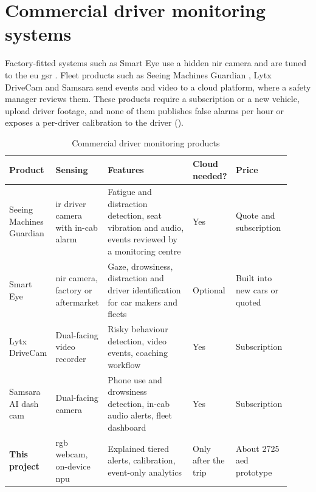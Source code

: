 \section{Commercial driver monitoring systems}
\label{sec:commercial}

Factory-fitted systems such as Smart Eye \cite{r62} use a hidden \gls{nir} camera and are tuned to the \gls{eu} \gls{gsr} \cite{r11}. Fleet products such as Seeing Machines Guardian \cite{r61}, Lytx DriveCam \cite{r63} and Samsara \cite{r64} send events and video to a cloud platform, where a safety manager reviews them. These products require a subscription or a new vehicle, upload driver footage, and none of them publishes false alarms per hour or exposes a per-driver calibration to the driver ().


\begin{table}[htbp]
\centering
\caption{Commercial driver monitoring products}
\label{tab:ch2-02}
\footnotesize
\setlength{\tabcolsep}{3pt}
\renewcommand{\arraystretch}{1.15}
\begin{tabular}{|p{0.165\linewidth}|p{0.175\linewidth}|p{0.300\linewidth}|p{0.130\linewidth}|p{0.150\linewidth}|}
\hline
\textbf{Product} & \textbf{Sensing} & \textbf{Features} & \textbf{Cloud needed?} & \textbf{Price} \\
\hline
Seeing Machines Guardian \cite{r61} & \gls{ir} driver camera with in-cab alarm & Fatigue and distraction detection, seat vibration and audio, events reviewed by a monitoring centre & Yes & Quote and subscription \\
\hline
Smart Eye \cite{r62} & \gls{nir} camera, factory or aftermarket & Gaze, drowsiness, distraction and driver identification for car makers and fleets & Optional & Built into new cars or quoted \\
\hline
Lytx DriveCam \cite{r63} & Dual-facing video recorder & Risky behaviour detection, video events, coaching workflow & Yes & Subscription \\
\hline
Samsara AI dash cam \cite{r64} & Dual-facing camera & Phone use and drowsiness detection, in-cab audio alerts, fleet dashboard & Yes & Subscription \\
\hline
\textbf{This project} & \gls{rgb} webcam, on-device \gls{npu} & Explained tiered alerts, calibration, event-only analytics & Only after the trip & About 2725 \gls{aed} prototype \\
\hline
\end{tabular}
\end{table}

